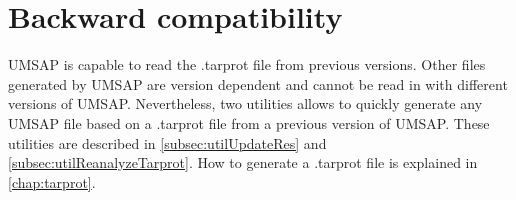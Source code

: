 \section{Backward compatibility}
\label{sec:backwardCompatibility}

UMSAP is capable to read the .tarprot file from previous versions. Other files generated by UMSAP are version dependent and cannot be read in with different versions of UMSAP. Nevertheless, two utilities allows to quickly generate any UMSAP file based on a .tarprot file from a previous version of UMSAP. These utilities are described in \autoref{subsec:utilUpdateRes} and \autoref{subsec:utilReanalyzeTarprot}. How to generate a .tarprot file is explained in \autoref{chap:tarprot}.